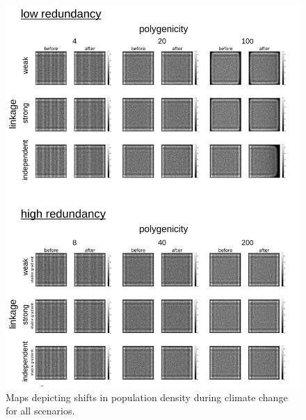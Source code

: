 \documentclass[9pt,twocolumn,twoside,lineno]{pnas-new}
\begin{document}
\begin{figure}
\centering
\includegraphics[width=.8\linewidth]{pub/figs/FIG_S4_density_shift.jpg}
\caption{Maps depicting shifts in population density during climate change for all scenarios.}
\label{fig:fig_s4}
\end{figure}


\end{document}
